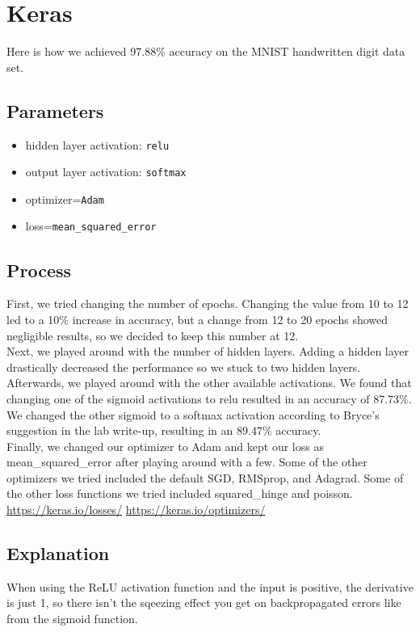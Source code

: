 \documentclass[11pt]{article}
\begin{document}
\section{Keras}

Here is how we achieved 97.88\%
accuracy on the MNIST handwritten digit data set.

\subsection{Parameters}

\begin{itemize}
 \item hidden layer activation: \texttt{relu}
 \item output layer activation: \texttt{softmax}
 \item optimizer=\texttt{Adam}
 \item loss=\texttt{mean\_squared\_error}
\end{itemize}

\subsection{Process}


First, we tried changing the number of epochs. Changing the value from 10 to 12 led to a 10\% increase in accuracy,
but a change from 12 to 20 epochs showed negligible results, so we decided to keep this number at 12. \\
Next, we played around with the number of hidden layers. Adding a hidden layer drastically decreased the performance
so we stuck to two hidden layers.
Afterwards, we played around with the other available activations. We found that changing one of the sigmoid activations
to relu resulted in an accuracy of 87.73\%. We changed the other sigmoid to a softmax activation according to Bryce's suggestion
in the lab write-up, resulting in an 89.47\% accuracy. \\
Finally, we changed our optimizer to Adam and kept our loss as mean\_squared\_error after playing around with a few. Some of the other optimizers we tried included the default SGD, RMSprop, and Adagrad. Some of the other loss functions we tried included squared\_hinge and poisson. \\
\url{https://keras.io/losses/} \url{https://keras.io/optimizers/}

\subsection{Explanation}
When using the ReLU activation function and the input is positive, the derivative is just 1, so there isn't the sqeezing effect you get on backpropagated errors like from the sigmoid function.
\end{document}
